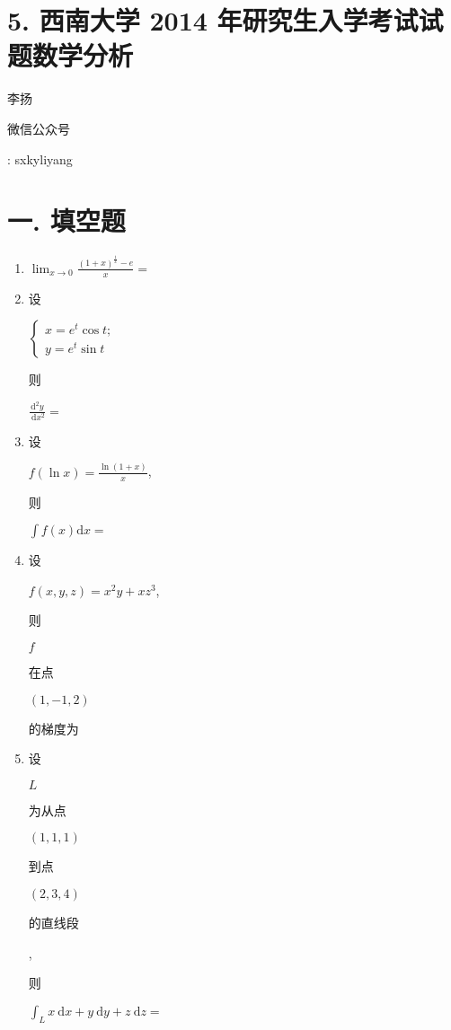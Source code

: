 \documentclass[10pt]{article}
\begin{document}
\section{5. 西南大学 2014 年研究生入学考试试题数学分析}
\begin{CJK}{UTF8}{mj}李扬\end{CJK}

\begin{CJK}{UTF8}{mj}微信公众号\end{CJK}: sxkyliyang

\section{一. 填空题}
\begin{enumerate}
  \item $\lim _{x \rightarrow 0} \frac{(1+x)^{\frac{1}{x}}-e}{x}=$

  \item \begin{CJK}{UTF8}{mj}设\end{CJK} $\left\{\begin{array}{l}x=e^{t} \cos t ; \\ y=e^{t} \sin t\end{array}\right.$ \begin{CJK}{UTF8}{mj}则\end{CJK} $\frac{\mathrm{d}^{2} y}{\mathrm{~d} x^{2}}=$

  \item \begin{CJK}{UTF8}{mj}设\end{CJK} $f(\ln x)=\frac{\ln (1+x)}{x}$, \begin{CJK}{UTF8}{mj}则\end{CJK} $\int f(x) \mathrm{d} x=$

  \item \begin{CJK}{UTF8}{mj}设\end{CJK} $f(x, y, z)=x^{2} y+x z^{3}$, \begin{CJK}{UTF8}{mj}则\end{CJK} $f$ \begin{CJK}{UTF8}{mj}在点\end{CJK} $(1,-1,2)$ \begin{CJK}{UTF8}{mj}的梯度为\end{CJK}

  \item \begin{CJK}{UTF8}{mj}设\end{CJK} $L$ \begin{CJK}{UTF8}{mj}为从点\end{CJK} $(1,1,1)$ \begin{CJK}{UTF8}{mj}到点\end{CJK} $(2,3,4)$ \begin{CJK}{UTF8}{mj}的直线段\end{CJK}, \begin{CJK}{UTF8}{mj}则\end{CJK} $\int_{L} x \mathrm{~d} x+y \mathrm{~d} y+z \mathrm{~d} z=$


\end{enumerate}
\end{document}
